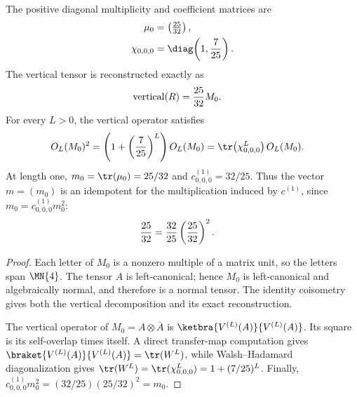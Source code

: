 \begin{lemma}
    The positive diagonal multiplicity and coefficient matrices are
    \begin{align}
        \mu_0        & =\begin{pmatrix}\frac{25}{32}\end{pmatrix},
        \notag                                                     \\
        \chi_{0,0,0} & =\diag\!\left(1,\frac{7}{25}\right).
        \notag
    \end{align}
    The vertical tensor is reconstructed exactly as
    \begin{align}
        \operatorname{vertical}(R) & =\frac{25}{32}M_0.
        \notag
    \end{align}
    For every $L>0$, the vertical operator satisfies
    \begin{align}
        O_L(M_0)^2
         & =\left(1+\left(\frac{7}{25}\right)^L\right)O_L(M_0)
        =\tr\!\left(\chi_{0,0,0}^L\right)O_L(M_0).
        \notag
    \end{align}
    At length one, $m_0=\tr(\mu_0)=25/32$ and
    $c^{(1)}_{0,0,0}=32/25$. Thus the vector $m=(m_0)$ is an idempotent
    for the multiplication induced by $c^{(1)}$, since
    $m_0=c^{(1)}_{0,0,0}m_0^2$:
    \begin{align}
        \frac{25}{32}
         & =\frac{32}{25}\left(\frac{25}{32}\right)^2.
        \notag
    \end{align}
\end{lemma}

\begin{proof}\leanok
    Each letter of $M_0$ is a nonzero multiple of a matrix unit, so the letters
    span $\MN{4}$. The tensor $A$ is left-canonical; hence $M_0$ is
    left-canonical and algebraically normal, and therefore is a normal tensor.
    The identity coisometry gives both the vertical decomposition and
    its exact reconstruction.

    The vertical operator of $M_0=A\otimes\overline A$ is
    $\ketbra{V^{(L)}(A)}{V^{(L)}(A)}$. Its square is its self-overlap times
    itself. A direct transfer-map computation gives
    $\braket{V^{(L)}(A)}{V^{(L)}(A)}=\tr(W^L)$, while
    Walsh--Hadamard diagonalization gives
    $\tr(W^L)=\tr(\chi_{0,0,0}^L)=1+(7/25)^L$.
    Finally, $c^{(1)}_{0,0,0}m_0^2=(32/25)(25/32)^2=m_0$.
\end{proof}

